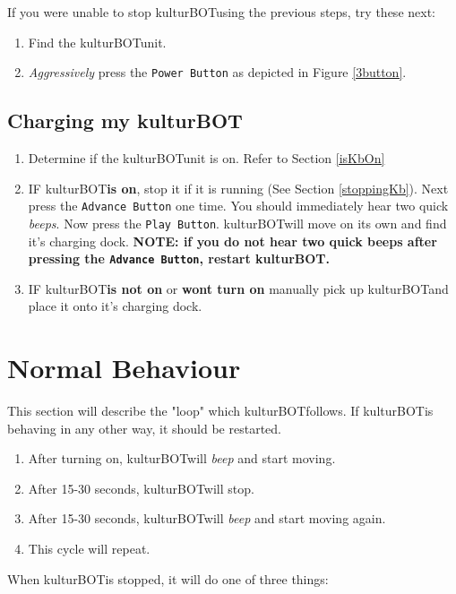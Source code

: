 \documentclass[]{article}
\newcommand{\kb}{kulturBOT}
\newcommand{\kbspace}{\kb \space}
\newcommand{\mykb}{my \kb}
\begin{document}
If you were unable to stop \kbspace using the previous steps, try these next:

\begin{enumerate}
\item Find the \kbspace unit.
\item \textit{Aggressively} press the \texttt{Power Button} as depicted in Figure \ref{3button}.
\end{enumerate}

\subsection{Charging \mykb}
\label{chargingKB}

\begin{enumerate}
\item Determine if the \kbspace unit is on. Refer to Section \ref{isKbOn}
\item IF \kbspace \textbf{is on}, stop it if it is running (See Section \ref{stoppingKb}). Next press the \texttt{Advance Button} one time. You should immediately hear two quick \textit{beeps}. Now press the \texttt{Play Button}. \kbspace will move on its own and find it's charging dock.
\subitem \textbf{NOTE: if you do not hear two quick beeps after pressing the \texttt{Advance Button}, restart \kb.}
\item IF \kbspace \textbf{is not on} or \textbf{wont turn on} manually pick up \kbspace and place it onto it's charging dock.
\end{enumerate}

\section{Normal Behaviour}

This section will describe the "loop" which \kbspace follows. If \kbspace is behaving in any other way, it should be restarted.

\begin{enumerate}
\item After turning on, \kbspace will \textit{beep} and start moving.
\item After 15-30 seconds, \kbspace will stop.
\item After 15-30 seconds, \kbspace will \textit{beep} and start moving again.
\item This cycle will repeat.
\end{enumerate}

When \kbspace is stopped, it will do one of three things:
\end{document}
